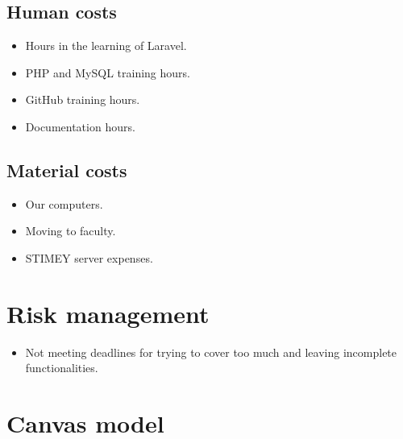 \subsection{Human costs}
\begin{itemize}
	\item Hours in the learning of Laravel.
	\item PHP and MySQL training hours.
	\item GitHub training hours.
	\item Documentation hours.
\end{itemize}

\subsection{Material costs}
\begin{itemize}
	\item Our computers.
	\item Moving to faculty.
	\item STIMEY server expenses.
\end{itemize}

\section{Risk management}
\begin{itemize}
	\item Not meeting deadlines for trying to cover too much and leaving incomplete functionalities.
\end{itemize}

\section{Canvas model}
